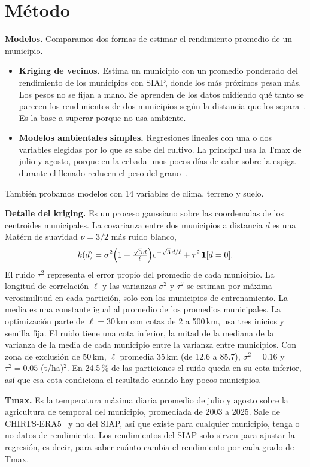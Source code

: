 \section{Método}\label{sec:metodo}

\textbf{Modelos.} Comparamos dos formas de estimar el rendimiento promedio de un municipio.
\begin{itemize}
\item \textbf{Kriging de vecinos.} Estima un municipio con un promedio ponderado del rendimiento de los municipios
con SIAP, donde los más próximos pesan más. Los pesos no se fijan a mano. Se aprenden de los datos midiendo qué tanto
se parecen los rendimientos de dos municipios según la distancia que los separa~\cite{rasmussen2006,oliver2014}. Es la
base a superar porque no usa ambiente.
\item \textbf{Modelos ambientales simples.} Regresiones lineales con una o dos variables elegidas por lo que se sabe
del cultivo. La principal usa la Tmax de julio y agosto, porque en la cebada unos pocos días de calor sobre la espiga
durante el llenado reducen el peso del grano~\cite{passarella2002}.
\end{itemize}
También probamos modelos con 14 variables de clima, terreno y suelo.

\textbf{Detalle del kriging.} Es un proceso gaussiano sobre las coordenadas de los centroides municipales. La
covarianza entre dos municipios a distancia $d$ es una Matérn de suavidad $\nu = 3/2$ más ruido blanco,
\[
k(d) = \sigma^2\Bigl(1 + \tfrac{\sqrt{3}\,d}{\ell}\Bigr)e^{-\sqrt{3}\,d/\ell} + \tau^2\,\mathbf{1}[d = 0].
\]
El ruido $\tau^2$ representa el error propio del promedio de cada municipio. La longitud de correlación $\ell$ y las
varianzas $\sigma^2$ y $\tau^2$ se estiman por máxima verosimilitud en cada partición, solo con los municipios de
entrenamiento. La media es una constante igual al promedio de los promedios municipales. La optimización parte de
$\ell = 30$\,km con cotas de 2 a 500\,km, usa tres inicios y semilla fija. El ruido tiene una cota inferior, la mitad
de la mediana de la varianza de la media de cada municipio entre la varianza entre municipios. Con zona de exclusión
de 50\,km, $\ell$ promedia 35\,km (de 12.6 a 85.7), $\sigma^2 = 0.16$ y $\tau^2 = 0.05$ (t/ha)$^2$. En 24.5\,\% de las
particiones el ruido queda en su cota inferior, así que esa cota condiciona el resultado cuando hay pocos municipios.

\textbf{Tmax.} Es la temperatura máxima diaria promedio de julio y agosto sobre la agricultura de temporal del
municipio, promediada de 2003 a 2025. Sale de CHIRTS-ERA5~\cite{chirts,verdin2020} y no del SIAP, así que existe para
cualquier municipio, tenga o no datos de rendimiento. Los rendimientos del SIAP solo sirven para ajustar la
regresión, es decir, para saber cuánto cambia el rendimiento por cada grado de Tmax.

